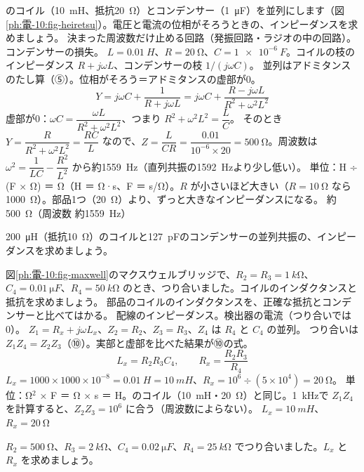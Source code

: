 \begin{phreidai}[並列共振のインピーダンス]
\label{ph:電-10:ex10}のコイル（\qty{10}{mH}、抵抗\qty{20}{\ohm}）とコンデンサー（\qty{1}{\micro F}）を並列にします（図\ref{ph:電-10:fig-heiretsu}）。電圧と電流の位相がそろうときの、インピーダンスを求めましょう。
\phbamen
決まった周波数だけ止める回路（発振回路・ラジオの中の回路）。
\phmushi
コンデンサーの損失。
\phzu
$L=\qty{0.01}{H}$、$R=\qty{20}{\ohm}$、$C=\qty{1e-6}{F}$。コイルの枝のインピーダンス $R+j\omega L$、コンデンサーの枝 $1/(j\omega C)$。
\phriyu
並列はアドミタンスのたし算（⑤）。位相がそろう＝アドミタンスの虚部が0。
\phtateru
\[ Y=j\omega C+\frac{1}{R+j\omega L}=j\omega C+\frac{R-j\omega L}{R^2+\omega^2L^2} \]
虚部が0：$\omega C=\dfrac{\omega L}{R^2+\omega^2L^2}$、つまり $R^2+\omega^2L^2=\dfrac{L}{C}$。
\phtoku
そのとき $Y=\dfrac{R}{R^2+\omega^2L^2}=\dfrac{RC}{L}$ なので、$Z=\dfrac{L}{CR}=\dfrac{0.01}{10^{-6}\times20}=\qty{500}{\ohm}$。周波数は $\omega^2=\dfrac{1}{LC}-\dfrac{R^2}{L^2}$ から約\qty{1559}{Hz}（直列共振の\qty{1592}{Hz}より少し低い）。
\phtashikame
単位：H ÷ (F × Ω) ＝ Ω（H ＝ Ω·s、F ＝ s/Ω）。$R$ が小さいほど大きい（$R=\qty{10}{\ohm}$ なら\qty{1000}{\ohm}）。部品1つ（\qty{20}{\ohm}）より、ずっと大きなインピーダンスになる。
\kotae 約\qty{500}{\ohm}（周波数 約\qty{1559}{Hz}）
\end{phreidai}
\begin{jibun}
\qty{200}{\micro H}（抵抗\qty{10}{\ohm}）のコイルと\qty{127}{pF}のコンデンサーの並列共振の、インピーダンスを求めましょう。
\end{jibun}

\begin{phreidai}[マクスウェルブリッジでコイルをはかる]
\label{ph:電-10:ex11}図\ref{ph:電-10:fig-maxwell}のマクスウェルブリッジで、$R_2=R_3=\qty{1}{k\ohm}$、$C_4=\qty{0.01}{\micro F}$、$R_4=\qty{50}{k\ohm}$ のとき、つり合いました。コイルのインダクタンスと抵抗を求めましょう。
\phbamen
部品のコイルのインダクタンスを、正確な抵抗とコンデンサーと比べてはかる。
\phmushi
配線のインピーダンス。検出器の電流（つり合いでは0）。
\phzu
$Z_1=R_x+j\omega L_x$、$Z_2=R_2$、$Z_3=R_3$、$Z_4$ は $R_4$ と $C_4$ の並列。
\phriyu
つり合いは $Z_1Z_4=Z_2Z_3$（⑩）。実部と虚部を比べた結果が⑩の式。
\phtateru
\[ L_x=R_2R_3C_4,\qquad R_x=\frac{R_2R_3}{R_4} \]
\phtoku
$L_x=1000\times1000\times10^{-8}=\qty{0.01}{H}=\qty{10}{mH}$、$R_x=10^6\div(5\times10^4)=\qty{20}{\ohm}$。
\phtashikame
単位：Ω$^2$ × F ＝ Ω × s ＝ H。のコイル（\qty{10}{mH}・\qty{20}{\ohm}）と同じ。\qty{1}{kHz}で $Z_1Z_4$ を計算すると、$Z_2Z_3=10^6$ に合う（周波数によらない）。
\kotae $L_x=\qty{10}{mH}$、$R_x=\qty{20}{\ohm}$
\end{phreidai}
\begin{jibun}
$R_2=\qty{500}{\ohm}$、$R_3=\qty{2}{k\ohm}$、$C_4=\qty{0.02}{\micro F}$、$R_4=\qty{25}{k\ohm}$ でつり合いました。$L_x$ と $R_x$ を求めましょう。
\end{jibun}

